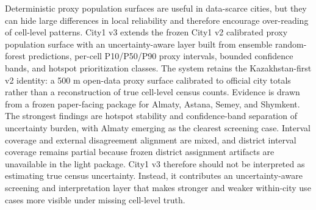 Deterministic proxy population surfaces are useful in data-scarce cities, but they can hide large differences in local reliability and therefore encourage over-reading of cell-level patterns. City1 v3 extends the frozen City1 v2 calibrated proxy population surface with an uncertainty-aware layer built from ensemble random-forest predictions, per-cell P10/P50/P90 proxy intervals, bounded confidence bands, and hotspot prioritization classes. The system retains the Kazakhstan-first v2 identity: a 500 m open-data proxy surface calibrated to official city totals rather than a reconstruction of true cell-level census counts. Evidence is drawn from a frozen paper-facing package for Almaty, Astana, Semey, and Shymkent. The strongest findings are hotspot stability and confidence-band separation of uncertainty burden, with Almaty emerging as the clearest screening case. Interval coverage and external disagreement alignment are mixed, and district interval coverage remains partial because frozen district assignment artifacts are unavailable in the light package. City1 v3 therefore should not be interpreted as estimating true census uncertainty. Instead, it contributes an uncertainty-aware screening and interpretation layer that makes stronger and weaker within-city use cases more visible under missing cell-level truth.

